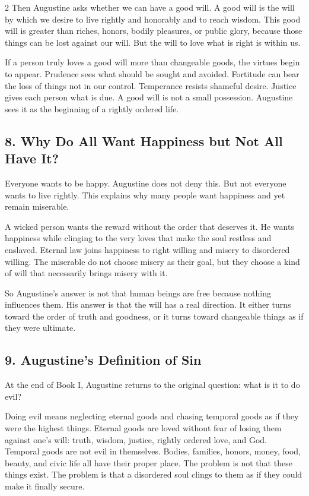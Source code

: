 \documentclass[12pt]{article}
\begin{document}
\begin{multicols}{2}
Then Augustine asks whether we can have a good will. A good will is the will by which we desire to live rightly and honorably and to reach wisdom. This good will is greater than riches, honors, bodily pleasures, or public glory, because those things can be lost against our will. But the will to love what is right is within us.

If a person truly loves a good will more than changeable goods, the virtues begin to appear. Prudence sees what should be sought and avoided. Fortitude can bear the loss of things not in our control. Temperance resists shameful desire. Justice gives each person what is due. A good will is not a small possession. Augustine sees it as the beginning of a rightly ordered life.

\subsection*{8. Why Do All Want Happiness but Not All Have It?}
Everyone wants to be happy. Augustine does not deny this. But not everyone wants to live rightly. This explains why many people want happiness and yet remain miserable.

A wicked person wants the reward without the order that deserves it. He wants happiness while clinging to the very loves that make the soul restless and enslaved. Eternal law joins happiness to right willing and misery to disordered willing. The miserable do not choose misery as their goal, but they choose a kind of will that necessarily brings misery with it.

So Augustine's answer is not that human beings are free because nothing influences them. His answer is that the will has a real direction. It either turns toward the order of truth and goodness, or it turns toward changeable things as if they were ultimate.

\subsection*{9. Augustine's Definition of Sin}
At the end of Book I, Augustine returns to the original question: what is it to do evil?

Doing evil means neglecting eternal goods and chasing temporal goods as if they were the highest things. Eternal goods are loved without fear of losing them against one's will: truth, wisdom, justice, rightly ordered love, and God. Temporal goods are not evil in themselves. Bodies, families, honors, money, food, beauty, and civic life all have their proper place. The problem is not that these things exist. The problem is that a disordered soul clings to them as if they could make it finally secure.


\end{multicols}
\end{document}
